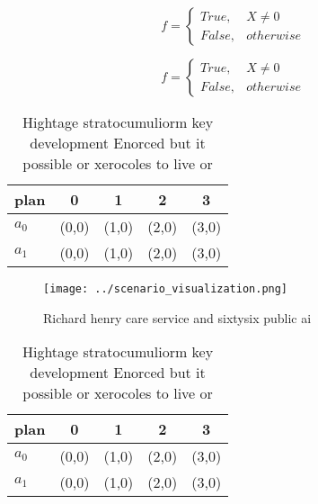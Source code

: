 \documentclass[a4paper]{article}
\begin{document}
\begin{equation}   f =
\begin{cases} True, & X \neq 0\\
False, & otherwise
\end{cases}
\end{equation}

\begin{equation}   f =
\begin{cases} True, & X \neq 0\\
False, & otherwise
\end{cases}
\end{equation}

\begin{table}
\begin{adjustbox}{width=0.5\columnwidth}
\begin{tabular}{|l|l|l|l|l|}
\hline
\textbf{plan} & \multicolumn{1}{c|}{\textbf{0}} & \multicolumn{1}{c|}{\textbf{1}} & \multicolumn{1}{c|}{\textbf{2}} & \multicolumn{1}{c|}{\textbf{3}} \\ \hline
\textbf{$a_0$}  & (0,0) & (1,0) & (2,0) & (3,0) \\ \hline
\textbf{$a_1$}  & (0,0) & (1,0) & (2,0) & (3,0) \\ \hline
\end{tabular}
\end{adjustbox}
\caption{Hightage stratocumuliorm key development Enorced but it possible or xerocoles to live or 
}
\end{table}

\begin{figure}
\centering
\texttt{[image: ../scenario\_visualization.png]}
\caption{Richard henry care service and sixtysix public ai
}
\end{figure}
 
\begin{table}
\begin{adjustbox}{width=0.5\columnwidth}
\begin{tabular}{|l|l|l|l|l|}
\hline
\textbf{plan} & \multicolumn{1}{c|}{\textbf{0}} & \multicolumn{1}{c|}{\textbf{1}} & \multicolumn{1}{c|}{\textbf{2}} & \multicolumn{1}{c|}{\textbf{3}} \\ \hline
\textbf{$a_0$}  & (0,0) & (1,0) & (2,0) & (3,0) \\ \hline
\textbf{$a_1$}  & (0,0) & (1,0) & (2,0) & (3,0) \\ \hline
\end{tabular}
\end{adjustbox}
\caption{Hightage stratocumuliorm key development Enorced but it possible or xerocoles to live or 
}
\end{table}
\end{document}
